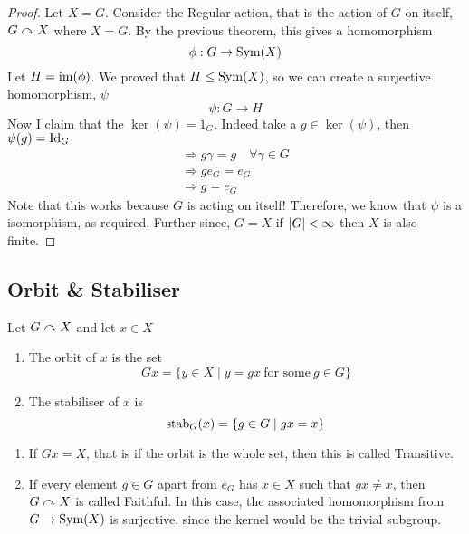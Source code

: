 \documentclass{article}
\begin{document}
\begin{proof}
    Let $X = G$. Consider the Regular action, that is the action of $G$ on itself, $G \curvearrowright X$ where $X = G$. By the previous theorem, this gives a homomorphism
    \[
        \phi: G \rightarrow \operatorname{Sym}(X)  
    \]
    Let $H = \operatorname{im}(\phi)$. We proved that $H \leq \operatorname{Sym}(X)$, so we can create a surjective homomorphism, $\psi$
    \[
        \psi: G \rightarrow H  
    \]
    Now I claim that the $\ker(\psi) = 1_G$. Indeed take a $g \in \ker(\psi)$, then $\psi(g) = \mathrm{Id}_G$
    \begin{align*}
        \Rightarrow g \gamma = g \quad \forall \gamma \in G \\
        \Rightarrow g e_G = e_G \\
        \Rightarrow g = e_G
    \end{align*}
    Note that this works because $G$ is acting on itself! Therefore, we know that $\psi$ is a isomorphism, as required. Further since, $G = X$ if $\left\lvert G\right\rvert < \infty$ then $X$ is also finite.
\end{proof}

\subsection{Orbit \& Stabiliser}

\begin{defi}
    Let $G \curvearrowright X$ and let $x \in X$
    \begin{enumerate}
        \item The orbit of $x$ is the set
        \[
            Gx = \{y \in X \mid y = gx \ \text{for some} \ g \in G\}  
        \]
        \item The stabiliser of $x$ is
        \[
            \operatorname{stab}_G(x) = \{g \in G \mid gx = x\}
        \]
    \end{enumerate}    
\end{defi}

\begin{remark}\leavevmode
    \begin{enumerate}
        \item If $Gx = X$, that is if the orbit is the whole set, then this is called Transitive.
        \item If every element $g \in G$ apart from $e_G$ has $x \in X$ such that $gx \neq x$, then $G \curvearrowright X$ is called Faithful. In this case, the associated homomorphism from $G \rightarrow \operatorname{Sym}(X)$ is surjective, since the kernel would be the trivial subgroup.
    \end{enumerate}
\end{remark}
\end{document}
